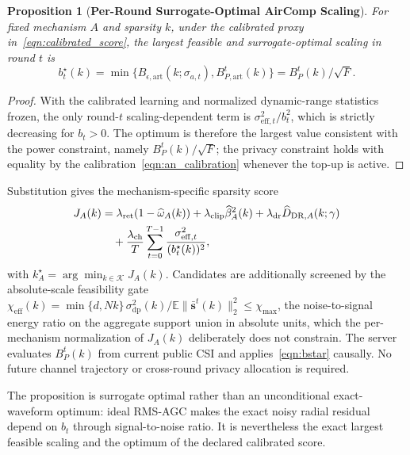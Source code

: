 \documentclass[journal]{IEEEtran}
\newenvironment{revisionblock}{\begingroup\color{revisionred}}{\endgroup}
\newtheorem{proposition}{Proposition}
\begin{document}
\begin{revisionblock}
\begin{proposition}[\bf Per-Round Surrogate-Optimal AirComp Scaling]
\label{prop:per_round_power}
For fixed mechanism $A$ and sparsity $k$, under the calibrated proxy in~\eqref{eqn:calibrated_score}, the largest feasible and surrogate-optimal scaling in round $t$ is
\begin{equation}
 b_t^\star(k)=\min\{B_{\epsilon,\mathrm{art}}(k;\sigma_{a,t}),B_{P,\mathrm{art}}^t(k)\}=B_P^t(k)/\sqrt F.
 \label{eqn:bstar}
\end{equation}
\end{proposition}
\begin{proof}
With the calibrated learning and normalized dynamic-range statistics frozen, the only round-$t$ scaling-dependent term is $\sigma_{\mathrm{eff},t}^2/b_t^2$, which is strictly decreasing for $b_t>0$. The optimum is therefore the largest value consistent with the power constraint, namely $B_P^t(k)/\sqrt F$; the privacy constraint holds with equality by the calibration~\eqref{eqn:an_calibration} whenever the top-up is active.
\end{proof}

Substitution gives the mechanism-specific sparsity score
\begin{align}
 J_A(k)
 &=\lambda_{\mathrm{ret}}(1-\widehat\omega_A(k))
 +\lambda_{\mathrm{clip}}\widehat\beta_A^2(k)
 +\lambda_{\mathrm{dr}}\widehat D_{\mathrm{DR},A}(k;\gamma)\notag\\
 &\quad+\frac{\lambda_{\mathrm{ch}}}{T}\sum_{t=0}^{T-1}\frac{\sigma_{\mathrm{eff},t}^2}{(b_t^\star(k))^2},
\end{align}
with $k_A^\star=\arg\min_{k\in\mathcal K}J_A(k)$. Candidates are additionally screened by the absolute-scale feasibility gate
$\chi_{\mathrm{eff}}(k)=\min\{d,Nk\}\,\sigma_{\mathrm{dp}}^2(k)/\mathbb E\|\bar{\mathbf s}^t(k)\|_2^2\le\chi_{\max}$,
the noise-to-signal energy ratio on the aggregate support union in absolute units, which the per-mechanism normalization of $J_A(k)$ deliberately does not constrain. The server evaluates $B_P^t(k)$ from current public CSI and applies~\eqref{eqn:bstar} causally. No future channel trajectory or cross-round privacy allocation is required.

The proposition is surrogate optimal rather than an unconditional exact-waveform optimum: ideal RMS-AGC makes the exact noisy radial residual depend on $b_t$ through signal-to-noise ratio. It is nevertheless the exact largest feasible scaling and the optimum of the declared calibrated score.
\end{revisionblock}
\end{document}
